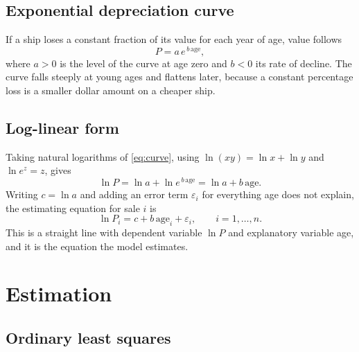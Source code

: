 \documentclass[11pt,a4paper]{article}
\newcommand{\age}{\mathrm{age}}
\begin{document}
\subsection{Exponential depreciation curve}

If a ship loses a constant fraction of its value for each year of age, value follows
\begin{equation}
\label{eq:curve}
P = a\,e^{\,b\,\age},
\end{equation}
where $a > 0$ is the level of the curve at age zero and $b < 0$ its rate of decline.
The curve falls steeply at young ages and flattens later, because a constant percentage loss is a smaller dollar amount on a cheaper ship.

\subsection{Log-linear form}

Taking natural logarithms of \eqref{eq:curve}, using $\ln(xy) = \ln x + \ln y$ and $\ln e^{z} = z$, gives
\[
\ln P = \ln a + \ln e^{\,b\,\age} = \ln a + b\,\age .
\]
Writing $c = \ln a$ and adding an error term $\varepsilon_i$ for everything age does not explain, the estimating equation for sale $i$ is
\begin{equation}
\label{eq:model}
\boxed{\;\ln P_i = c + b\,\age_i + \varepsilon_i, \qquad i = 1,\dots,n.\;}
\end{equation}
This is a straight line with dependent variable $\ln P$ and explanatory variable age, and it is the equation the model estimates.

\section{Estimation}

\subsection{Ordinary least squares}
\end{document}
